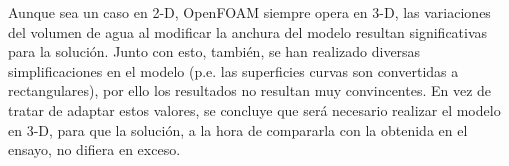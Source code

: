 Aunque sea un caso en 2-D, OpenFOAM siempre opera en 3-D, las
variaciones del volumen de agua al modificar la anchura del modelo
resultan significativas para la solución. Junto con esto, también, se
han realizado diversas simplificaciones en el modelo (p.e. las
superficies curvas son convertidas a rectangulares), por ello los
resultados no resultan muy convincentes. En vez de tratar de adaptar
estos valores, se concluye que será necesario realizar el modelo en 3-D,
para que la solución, a la hora de compararla con la obtenida en el
ensayo, no difiera en exceso.
